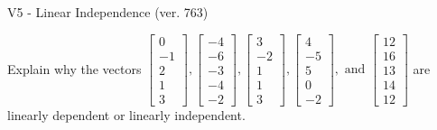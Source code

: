 \begin{exercise}
  \begin{exerciseTitle}V5 - Linear Independence (ver. 763)\end{exerciseTitle}
  \begin{exerciseStatement}
    Explain why the vectors \(\left[\begin{array}{r}
0 \\
-1 \\
2 \\
1 \\
3
\end{array}\right] , \left[\begin{array}{r}
-4 \\
-6 \\
-3 \\
-4 \\
-2
\end{array}\right] , \left[\begin{array}{r}
3 \\
-2 \\
1 \\
1 \\
3
\end{array}\right] , \left[\begin{array}{r}
4 \\
-5 \\
5 \\
0 \\
-2
\end{array}\right] , \text{ and } \left[\begin{array}{r}
12 \\
16 \\
13 \\
14 \\
12
\end{array}\right]\) are linearly dependent or linearly independent.	



\end{exerciseStatement}
\end{exercise}
